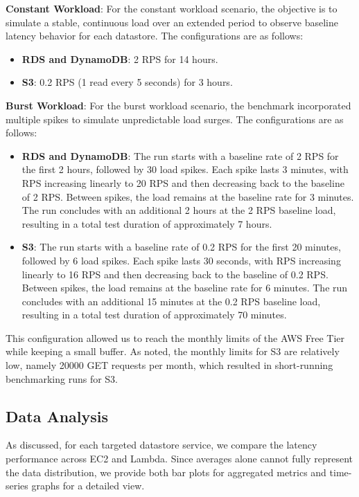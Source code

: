 \textbf{Constant Workload}: For the constant workload scenario, the objective is to simulate a stable, continuous load over an extended period to observe baseline latency behavior for each datastore. The configurations are as follows:
\begin{itemize}
	\item \textbf{RDS and DynamoDB}: 2 RPS for 14 hours.
	\item \textbf{S3}: 0.2 RPS (1 read every 5 seconds) for 3 hours.
\end{itemize}

\textbf{Burst Workload}: For the burst workload scenario, the benchmark incorporated multiple spikes to simulate unpredictable load surges. The configurations are as follows:
\begin{itemize}
	\item \textbf{RDS and DynamoDB}: The run starts with a baseline rate of 2 RPS for the first 2 hours, followed by 30 load spikes. Each spike lasts 3 minutes, with RPS increasing linearly to 20 RPS and then decreasing back to the baseline of 2 RPS. Between spikes, the load remains at the baseline rate for 3 minutes. The run concludes with an additional 2 hours at the 2 RPS baseline load, resulting in a total test duration of approximately 7 hours.
	\item \textbf{S3}: The run starts with a baseline rate of 0.2 RPS for the first 20 minutes, followed by 6 load spikes. Each spike lasts 30 seconds, with RPS increasing linearly to 16 RPS and then decreasing back to the baseline of 0.2 RPS. Between spikes, the load remains at the baseline rate for 6 minutes. The run concludes with an additional 15 minutes at the 0.2 RPS baseline load, resulting in a total test duration of approximately 70 minutes.
\end{itemize}

This configuration allowed us to reach the monthly limits of the AWS Free Tier while keeping a small buffer. As noted, the monthly limits for S3 are relatively low, namely 20000 GET requests per month, which resulted in short-running benchmarking runs for S3.

\subsection{Data Analysis}
\label{sec:analysis}

As discussed, for each targeted datastore service, we compare the latency performance across EC2 and Lambda. Since averages alone cannot fully represent the data distribution, we provide both bar plots for aggregated metrics and time-series graphs for a detailed view.

